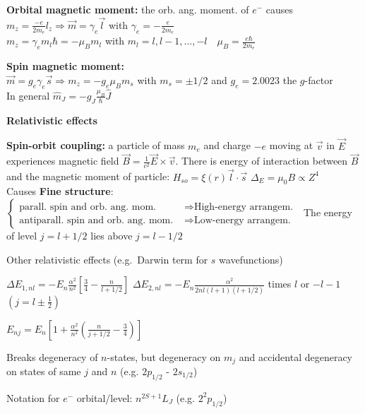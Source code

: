 \begin{squishlist}
        \item \textbf{Orbital magnetic moment:} the orb. ang. moment. of $e^-$ causes \\
        $m_z = \frac{-e}{2m_e}l_z \Longrightarrow \vec{m} = \gamma_e \vec{l}$ \quad with $\gamma_e = -\frac{e}{2m_e}$\\
        $m_z = \gamma_e m_l \hbar = -\mu_B m_l$ \quad with $m_l = l, l-1, \ldots, -l \quad \mu_B = \frac{e\hbar}{2m_e}$

        \item \textbf{Spin magnetic moment:} \\ $\vec{m} = g_e \gamma_e \vec{s} \Longrightarrow m_z = -g_e \mu_B m_s$ \quad with $m_s=\pm1/2$ and $g_e = 2.0023$ the $g$-factor \\
        In general $\hat{m}_J = - g_J \frac{\mu_B}{\hbar} \hat{J}$
    \end{squishlist} 
    
    \squishline

\textbf{Relativistic effects}
\begin{squishlist}
    \item \textbf{Spin-orbit coupling:} a particle of mass $m_e$ and charge $-e$ moving at $\vec{v}$ in $\vec{E}$ experiences magnetic field $\vec{B} = \frac{1}{c^2}\vec{E}\times \vec{v}$. There is energy of interaction between $\vec{B}$ and the magnetic moment of particle: $H_{so} = \xi(r) \vec{l}\cdot \vec{s}$ \qquad $\Delta_E = \mu_0 B \propto Z^4$\\
    Causes \textbf{Fine structure}: $\left\{\begin{aligned}
        \text{parall.\ spin and orb.\ ang.\ mom.\ } &\Rightarrow \text{High-energy arrangem.\ } \\
        \text{antiparall.\ spin and orb.\ ang.\ mom.\ } &\Rightarrow \text{Low-energy arrangem.\ }
    \end{aligned} \right.$
    The energy of level $j = l+1/2$ lies above $j = l-1/2$
    \item Other relativistic effects (e.g.\ Darwin term for $s$ wavefunctions)
    \item $\Delta E_{1,nl} = - E_n \frac{\alpha^2}{n^2}\left[\frac{3}{4}-\frac{n}{l+1/2}\right]$ \quad $\Delta E_{2,nl} = -E_n \frac{\alpha^2}{2nl(l+1)(l+1/2)}$ times $l$ or $-l-1$ $(j=l\pm\frac{1}{2})$
    \item $E_{nj} = E_n \left[1 + \frac{\alpha^2}{n^2}\left(\frac{n}{j+1/2}-\frac{3}{4}\right)\right]$
    \item Breaks degeneracy of $n$-states, but degeneracy on $m_j$ and accidental degeneracy on states of same $j$ and $n$ (e.g. $2p_{1/2}$ - $2s_{1/2}$)

    \item Notation for $e^-$ orbital/level: $n^{2S+1}L_J$ (e.g. $2^2 p_{1/2}$)
\end{squishlist}

